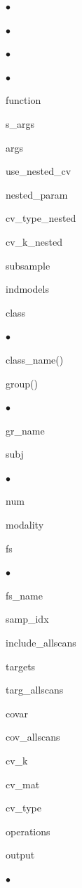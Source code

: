 \begin{list}{$\bullet$}
\begin{list}{$\bullet$}
\begin{list}{$\bullet$}
\begin{list}{$\bullet$}
\item function
\item s\_args
\item args
\end{list}
\item use\_nested\_cv
\item nested\_param
\item cv\_type\_nested
\item cv\_k\_nested
\item subsample
\item indmodels
\item class
\begin{list}{$\bullet$}
	{\setlength{\labelsep}{.2cm}\setlength{\itemindent}{0cm}\setlength{\leftmargin}{1.7cm}}
\item class\_name()
\item group()
\begin{list}{$\bullet$}
	{\setlength{\labelsep}{.2cm}\setlength{\itemindent}{0cm}\setlength{\leftmargin}{2.2cm}}
\item gr\_name
\item subj
\begin{list}{$\bullet$}
	{\setlength{\labelsep}{.2cm}\setlength{\itemindent}{0cm}\setlength{\leftmargin}{2.7cm}}
\item num
\item modality
\end{list}
\end{list}
\end{list}
\item fs
\begin{list}{$\bullet$}
	{\setlength{\labelsep}{.2cm}\setlength{\itemindent}{0cm}\setlength{\leftmargin}{1.7cm}}
\item fs\_name
\end{list}
\item samp\_idx
\item include\_allscans
\item targets
\item targ\_allscans
\item covar
\item cov\_allscans
\item cv\_k
\item cv\_mat
\item cv\_type
\item operations
\end{list}
\item output
\begin{list}{$\bullet$}
	{\setlength{\labelsep}{.2cm}\setlength{\itemindent}{0cm}\setlength{\leftmargin}{1.2cm}}

\end{list}
\end{list}
\end{list}
